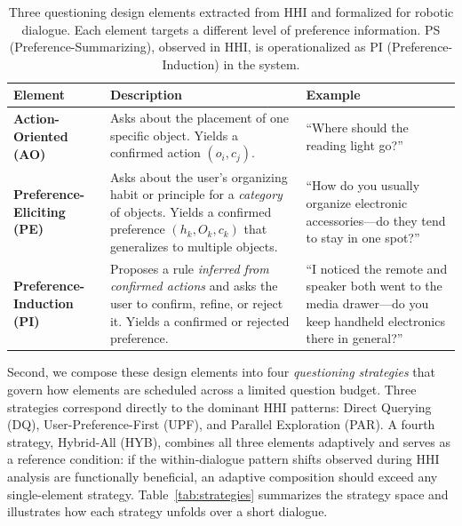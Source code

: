 \documentclass[manuscript,review,anonymous]{acmart}
\begin{document}
\begin{table}[t]
\centering
\caption{Three questioning design elements extracted from HHI and formalized for robotic dialogue. Each element targets a different level of preference information. PS (Preference-Summarizing), observed in HHI, is operationalized as PI (Preference-Induction) in the system.}
\label{tab:patterns}
\begin{tabularx}{\linewidth}{@{} l >{\raggedright\arraybackslash}X >{\raggedright\arraybackslash}X @{}}
\toprule
\textbf{Element} & \textbf{Description} & \textbf{Example} \\
\midrule
\textbf{Action-Oriented (AO)} &
Asks about the placement of one specific object. Yields a confirmed action $(o_i, c_j)$. &
``Where should the reading light go?'' \\
\midrule
\textbf{Preference-Eliciting (PE)} &
Asks about the user's organizing habit or principle for a \textit{category} of objects. Yields a confirmed preference $(h_k, O_k, c_k)$ that generalizes to multiple objects. &
``How do you usually organize electronic accessories---do they tend to stay in one spot?'' \\
\midrule
\textbf{Preference-Induction (PI)} &
Proposes a rule \textit{inferred from confirmed actions} and asks the user to confirm, refine, or reject it. Yields a confirmed or rejected preference. &
``I noticed the remote and speaker both went to the media drawer---do you keep handheld electronics there in general?'' \\
\bottomrule
\end{tabularx}
\end{table}

Second, we compose these design elements into four \textit{questioning strategies} that govern how elements are scheduled across a limited question budget. Three strategies correspond directly to the dominant HHI patterns: Direct Querying (DQ), User-Preference-First (UPF), and Parallel Exploration (PAR). A fourth strategy, Hybrid-All (HYB), combines all three elements adaptively and serves as a reference condition: if the within-dialogue pattern shifts observed during HHI analysis are functionally beneficial, an adaptive composition should exceed any single-element strategy. Table~\ref{tab:strategies} summarizes the strategy space and illustrates how each strategy unfolds over a short dialogue.
\end{document}
